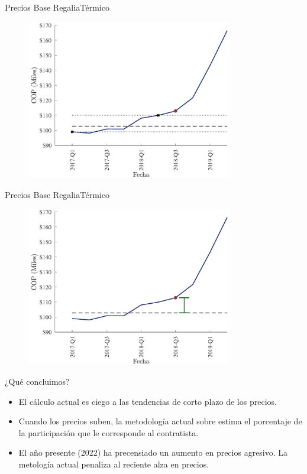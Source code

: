 \documentclass[usenames,dvipsnames]{beamer}
\begin{document}
\begin{frame}{Precios Base Regalia}{Térmico}
    \begin{figure}
        \centering
        \includegraphics[width=0.8\textwidth]{Figures/oldCalc3.pdf}
    \end{figure}
\end{frame}

\begin{frame}{Precios Base Regalia}{Térmico}
    \begin{figure}
        \centering
        \includegraphics[width=0.8\textwidth]{Figures/oldCalc4.pdf}
    \end{figure}
\end{frame}

\begin{frame}{¿Qué concluimos?}
\begin{itemize}
    \item El cálculo actual es ciego a las tendencias de corto plazo de los precios. 
    \item Cuando los precios suben, la metodología actual sobre estima el porcentaje de la participación que le corresponde al contratista. 
    \item El año presente (2022) ha precensiado un aumento en precios agresivo. La metología actual penaliza al reciente alza en precios. 
\end{itemize}
\end{frame}
\end{document}
